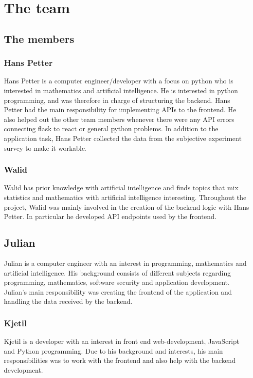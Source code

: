 \section{The team}

\subsection{The members}

\subsubsection*{Hans Petter}
Hans Petter is a computer engineer/developer with a focus on python who is interested in mathematics and artificial intelligence. He is interested in python programming, and was therefore in charge of structuring the backend. Hans Petter had the main responsibility for implementing APIs to the frontend. He also helped out the other team members whenever there were any API errors connecting flask to react or general python problems. In addition to the application task, Hans Petter collected the data from the subjective experiment survey to make it workable. 

\subsubsection*{Walid}
Walid has prior knowledge with artificial intelligence and finds topics that mix statistics and mathematics with artificial intelligence interesting. Throughout the project, Walid was mainly involved in the creation of the backend logic with Hans Petter. In particular he developed API endpoints used by the frontend. 

\subsection*{Julian}
Julian is a computer engineer with an interest in programming, mathematics and artificial intelligence. His background consists of different subjects regarding programming, mathematics, software security and application development. Julian's main responsibility was creating the frontend of the application and handling the data received by the backend. 

\subsubsection*{Kjetil}
Kjetil is a developer with an interest in front end web-development, JavaScript and Python programming. Due to his background and interests, his main responsibilities was to work with the frontend and also help with the backend development. 


